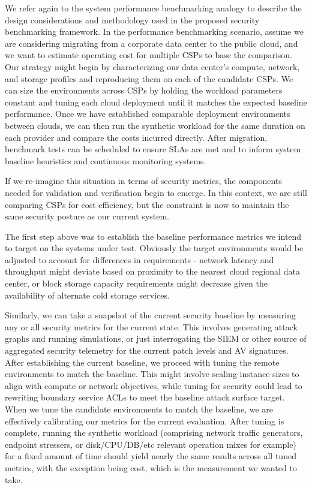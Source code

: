 

We refer again to the system performance benchmarking analogy to describe the design considerations and methodology used in the proposed security benchmarking framework. In the performance benchmarking scenario, assume we are considering migrating from a corporate data center to the public cloud, and we want to estimate operating cost for multiple CSPs to base the comparison. Our strategy might begin by characterizing our data center's compute, network, and storage profiles and reproducing them on each of the candidate CSPs.  We can size the environments across CSPs by holding the workload parameters constant and tuning each cloud deployment until it  matches the expected baseline performance. Once we have established comparable deployment environments between clouds, we can then run the synthetic workload for the same duration on each provider and compare the costs incurred directly. After migration, benchmark tests can be scheduled to ensure SLAs are met and to inform system baseline heuristics and continuous monitoring systems. 

If we re-imagine this situation in terms of security metrics, the components needed for validation and verification begin to emerge. In this context, we are still comparing CSPs for cost efficiency, but the constraint is now to maintain the same security posture as our current system. 

The first step above was to establish the baseline performance metrics we intend to target on the systems under test. Obviously the target environments would be adjusted to account for differences in requirements - network latency and throughput might deviate based on proximity to the nearest cloud regional data center, or block storage capacity requirements might decrease given the availability of alternate cold storage services. 

Similarly, we can take a snapshot of the current security baseline by measuring any or all security metrics for the current state. This involves generating attack graphs and running simulations, or just interrogating the SIEM or other source of aggregated security telemetry for the current patch levels and AV signatures. After establishing the current baseline, we proceed with tuning the remote environments to match the baseline. This might involve scaling instance sizes to align with compute or network objectives, while tuning for security could lead to rewriting boundary service ACLs to meet the baseline attack surface target. When we tune the candidate environments to match the baseline, we are effectively calibrating our metrics for the current evaluation. After tuning is complete, running the synthetic workload (comprising network traffic generators, endpoint stressers, or disk/CPU/DB/etc relevant operation mixes for example) for a fixed amount of time should yield nearly the same results across all tuned metrics, with the exception being cost, which is the measurement we wanted to take.

